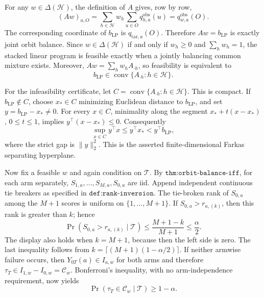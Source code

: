 For any \(w\in\Delta(\mathcal H)\), the definition of \(A\) gives, row by row, \[ (Aw)_{a,O}=\sum_{h\in\mathcal H}w_h\sum_{u\in O}q^{\mathrm{obs}}_{h,a}(u)=q^{\mathrm{obs}}_{w,a}(O). \] The corresponding coordinate of \(b_{\mathrm{LP}}\) is \(q_{\mathrm{tar},a}(O)\). Therefore \(Aw=b_{\mathrm{LP}}\) is exactly joint orbit balance. Since \(w\in\Delta(\mathcal H)\) if and only if \(w_h\ge0\) and \(\sum_h w_h=1\), the stacked linear program is feasible exactly when a jointly balancing common mixture exists. Moreover, \(Aw=\sum_h w_hA_{\cdot h}\), so feasibility is equivalent to \[ b_{\mathrm{LP}}\in\operatorname{conv}\{A_{\cdot h}:h\in\mathcal H\}. \]

For the infeasibility certificate, let \(C=\operatorname{conv}\{A_{\cdot h}:h\in\mathcal H\}\). This is compact. If \(b_{\mathrm{LP}}\notin C\), choose \(x_*\in C\) minimizing Euclidean distance to \(b_{\mathrm{LP}}\), and set \(y=b_{\mathrm{LP}}-x_*\ne0\). For every \(x\in C\), minimality along the segment \(x_*+t(x-x_*)\), \(0\le t\le1\), implies \(y^\top(x-x_*)\le0\). Consequently \[ \sup_{x\in C}y^\top x\le y^\top x_*<y^\top b_{\mathrm{LP}}, \] where the strict gap is \(\lVert y\rVert_2^2\). This is the asserted finite-dimensional Farkas separating hyperplane.

Now fix a feasible \(w\) and again condition on \(\mathcal T\). By \(\texttt{thm:orbit-balance-iff}\), for each arm separately, \(S_{1,a},\ldots,S_{M,a},S_{0,a}\) are iid. Append independent continuous tie breakers as specified in \(\texttt{def:rank-inversion}\). The tie-broken rank of \(S_{0,a}\) among the \(M+1\) scores is uniform on \(\{1,\ldots,M+1\}\). If \(S_{0,a}>r_{a,(k)}\), then this rank is greater than \(k\); hence \[ \Pr(S_{0,a}>r_{a,(k)}\mid\mathcal T)\le\frac{M+1-k}{M+1}\le\frac{\alpha}{2}. \] The display also holds when \(k=M+1\), because then the left side is zero. The last inequality follows from \(k=\lceil(M+1)(1-\alpha/2)\rceil\). If neither armwise failure occurs, then \(Y_{0T}(a)\in I_{a,w}\) for both arms and therefore \(\tau_T\in I_{1,w}-I_{0,w}=\mathcal C_w\). Bonferroni's inequality, with no arm-independence requirement, now yields \[ \Pr(\tau_T\in\mathcal C_w\mid\mathcal T)\ge1-\alpha. \]